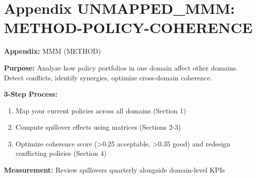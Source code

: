 %
%
%
%
%
%

\newpage
\section*{Appendix UNMAPPED_MMM: METHOD-POLICY-COHERENCE}
\label{app:method-policy-coherence}


\begin{tcolorbox}[colback=blue!5!white, colframe=blue!75!black, title=Quick Reference]
\textbf{Appendix:} MMM (METHOD)

\small
\textbf{Purpose:} Analyze how policy portfolios in one domain affect other domains. Detect conflicts, identify synergies, optimize cross-domain coherence.

\textbf{3-Step Process:}
\begin{enumerate}[nosep]
\item Map your current policies across all domains (Section 1)
\item Compute spillover effects using matrices (Sections 2-3)
\item Optimize coherence score (>0.25 acceptable, >0.35 good) and redesign conflicting policies (Section 4)
\end{enumerate}

\textbf{Measurement:} Review spillovers quarterly alongside domain-level KPIs
\end{tcolorbox}



